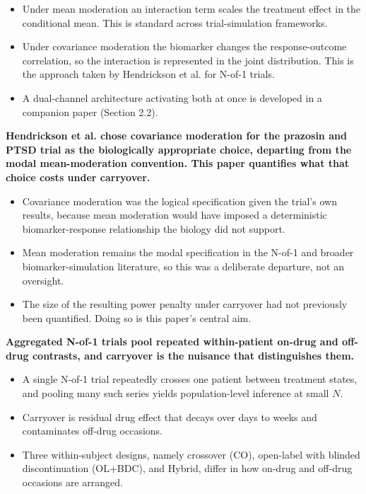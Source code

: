 \documentclass[
  11pt,
]{article}
\begin{document}
\begin{itemize}\setlength{\itemsep}{2pt}\setlength{\parskip}{0pt}
\item Under mean moderation an interaction term scales the
treatment effect in the conditional mean. This is standard across
trial-simulation frameworks.
\item Under covariance moderation the biomarker changes the
response-outcome correlation, so the interaction is represented in
the joint distribution. This is the approach taken by Hendrickson et
al. for N-of-1 trials.
\item A dual-channel architecture activating both at once is
developed in a companion paper (Section 2.2).
\end{itemize}

\textbf{Hendrickson et al. chose covariance moderation for the
prazosin and PTSD trial as the biologically appropriate choice,
departing from the modal mean-moderation convention. This paper
quantifies what that choice costs under carryover.}

\begin{itemize}\setlength{\itemsep}{2pt}\setlength{\parskip}{0pt}
\item Covariance moderation was the logical specification given the
trial's own results, because mean moderation would have imposed a
deterministic biomarker-response relationship the biology did not
support.
\item Mean moderation remains the modal specification in the N-of-1
and broader biomarker-simulation literature, so this was a
deliberate departure, not an oversight.
\item The size of the resulting power penalty under carryover had
not previously been quantified. Doing so is this paper's central
aim.
\end{itemize}

\textbf{Aggregated N-of-1 trials pool repeated within-patient
on-drug and off-drug contrasts, and carryover is the nuisance that
distinguishes them.}

\begin{itemize}\setlength{\itemsep}{2pt}\setlength{\parskip}{0pt}
\item A single N-of-1 trial repeatedly crosses one patient between
treatment states, and pooling many such series yields
population-level inference at small $N$.
\item Carryover is residual drug effect that decays over days to
weeks and contaminates off-drug occasions.
\item Three within-subject designs, namely crossover (CO),
open-label with blinded discontinuation (OL+BDC), and Hybrid,
differ in how on-drug and off-drug occasions are arranged.
\end{itemize}
\end{document}
